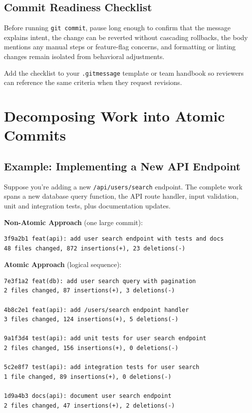 \subsection{Commit Readiness Checklist}
Before running \texttt{git commit}, pause long enough to confirm that the message explains intent, the change can be reverted without cascading rollbacks, the body mentions any manual steps or feature-flag concerns, and formatting or linting changes remain isolated from behavioral adjustments.

\begin{tipbox}
Add the checklist to your \texttt{.gitmessage} template or team handbook so reviewers can reference the same criteria when they request revisions.
\end{tipbox}

\section{Decomposing Work into Atomic Commits}

\subsection{Example: Implementing a New API Endpoint}

Suppose you're adding a new \texttt{/api/users/search} endpoint. The complete work spans a new database query function, the API route handler, input validation, unit and integration tests, plus documentation updates.

\textbf{Non-Atomic Approach} (one large commit):
\begin{lstlisting}[style=shell,caption={Single massive commit}]
3f9a2b1 feat(api): add user search endpoint with tests and docs
48 files changed, 872 insertions(+), 23 deletions(-)
\end{lstlisting}

\textbf{Atomic Approach} (logical sequence):
\begin{lstlisting}[style=shell,caption={Decomposed into atomic commits}]
7e3f1a2 feat(db): add user search query with pagination
2 files changed, 87 insertions(+), 3 deletions(-)

4b8c2e1 feat(api): add /users/search endpoint handler
3 files changed, 124 insertions(+), 5 deletions(-)

9a1f3d4 test(api): add unit tests for user search endpoint
2 files changed, 156 insertions(+), 0 deletions(-)

5c2e8f7 test(api): add integration tests for user search
1 file changed, 89 insertions(+), 0 deletions(-)

1d9a4b3 docs(api): document user search endpoint
2 files changed, 47 insertions(+), 2 deletions(-)
\end{lstlisting}

